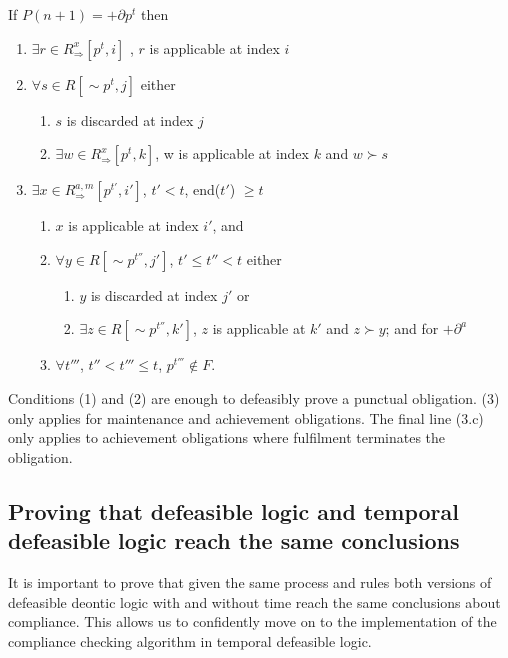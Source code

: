 \documentclass[10pt]{report}
\begin{document}
\begin{mydef} \label{def-temporal-proof}
If $P(n+1) = +\partial p^t$ then
\begin{enumerate}
\item $\exists r \in R^{x}_{\Rightarrow}\left[p^t,i\right]$ , $r$ is applicable at index $i$
\item $\forall s \in R[\sim p^t, j]$ either
      \begin{enumerate}
      \item $s$ is discarded at index $j$
      \item $\exists w \in R^{x}_{\Rightarrow}\left[p^t,k\right]$, w is applicable at index $k$ and $w\succ s$
      \end{enumerate}
\item $\exists x \in R^{a,m}_{\Rightarrow}\left[p^{t'},i'\right]$, $t' < t$, end($t'$) $\geq t$
      \begin{enumerate}
      \item $x$ is applicable at index $i'$, and
      \item $\forall y \in R\left[\sim p^{t''},j'\right]$, $t' \leq t'' < t$ either
            \begin{enumerate}
            \item $y$ is discarded at index $j'$ or
            \item $\exists z \in R\left[\sim p^{t''},k'\right]$, $z$ is applicable at $k'$ and $z\succ y$; and for $+\partial^a$
            \end{enumerate}
      \item $\forall t'''$, $t''<t'''\leq t$, $p^{t'''} \notin F$.
      \end{enumerate}
\end{enumerate}
\end{mydef}

Conditions (1) and (2) are enough to defeasibly prove a punctual obligation. (3) only applies for maintenance and achievement obligations. The final line (3.c) only applies to achievement obligations where fulfilment terminates the obligation.

\subsection{Proving that defeasible logic and temporal defeasible logic reach the same conclusions}

It is important to prove that given the same process and rules both versions of defeasible deontic logic with and without time reach the same conclusions about compliance. This allows us to confidently move on to the implementation of the compliance checking algorithm in temporal defeasible logic.
\end{document}
